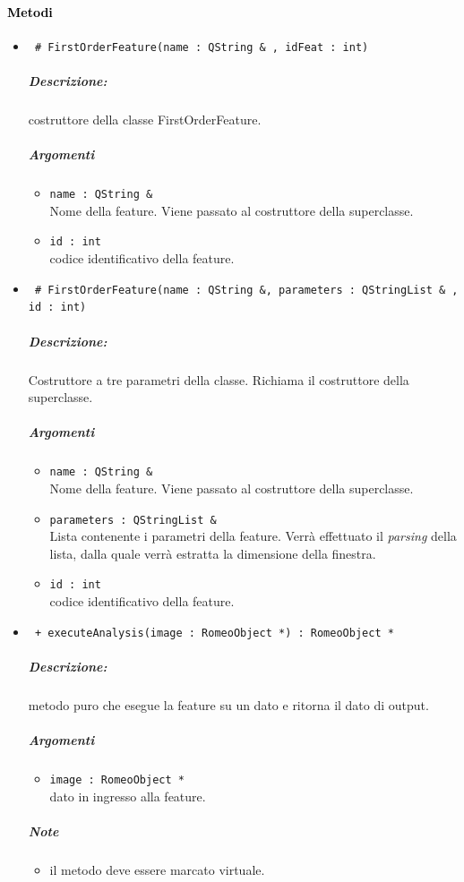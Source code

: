 \paragraph{\textcolor{black}{Metodi\\}}
	\begin{itemize}
	\item \color{blue}\verb! # FirstOrderFeature(name : QString & , idFeat : int)!
		\color{black}
		\subparagraph{Descrizione:} costruttore della classe FirstOrderFeature.
		\subparagraph{Argomenti}
			\begin{itemize}
				\item \color{RoyalPurple} \verb!name : QString &! \\ 
				\color{black} Nome della feature. Viene passato al costruttore della superclasse.	
				\item \color{RoyalPurple} \verb!id : int! \\ 
				\color{black} codice identificativo della feature\g{}.	
			\end{itemize}
			
	\item \color{blue}\verb! # FirstOrderFeature(name : QString &, parameters : QStringList & , id : int)!
		\color{black}
		\subparagraph{Descrizione:} Costruttore a tre parametri della classe. Richiama il costruttore della 						superclasse.
		\subparagraph{Argomenti}
			\begin{itemize}
				\item \color{RoyalPurple} \verb!name : QString &! \\ 
				\color{black} Nome della feature. Viene passato al costruttore della superclasse.	
				\item \color{RoyalPurple} \verb!parameters : QStringList &! \\ 
				\color{black} Lista contenente i parametri della feature\g{}. Verrà effettuato il \textit{parsing} 						della lista, dalla quale verrà estratta la dimensione della finestra.
				\item \color{RoyalPurple} \verb!id : int! \\ 
				\color{black} codice identificativo della feature\g{}.	
			\end{itemize}
			
	\item \color{blue}\verb! + executeAnalysis(image : RomeoObject *) : RomeoObject *!
		\color{black}
		\subparagraph{Descrizione:} metodo puro che esegue la feature su un dato e ritorna il dato di output.
		\subparagraph{Argomenti}
			\begin{itemize}
				\item \color{RoyalPurple} \verb!image : RomeoObject * ! \\ 
				\color{black} dato in ingresso alla feature.		
			\end{itemize}
		\subparagraph{Note}
			\begin{itemize}
				\item il metodo deve essere marcato virtuale.
			\end{itemize}
						

\end{itemize}

